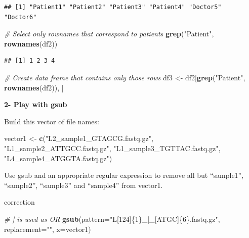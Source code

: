 \documentclass[]{book}
\newenvironment{Shaded}{\begin{snugshade}}{\end{snugshade}}
\newcommand{\CommentTok}[1]{\textcolor[rgb]{0.56,0.35,0.01}{\textit{#1}}}
\newcommand{\DataTypeTok}[1]{\textcolor[rgb]{0.13,0.29,0.53}{#1}}
\newcommand{\KeywordTok}[1]{\textcolor[rgb]{0.13,0.29,0.53}{\textbf{#1}}}
\newcommand{\NormalTok}[1]{#1}
\newcommand{\StringTok}[1]{\textcolor[rgb]{0.31,0.60,0.02}{#1}}
\begin{document}
\begin{verbatim}
## [1] "Patient1" "Patient2" "Patient3" "Patient4" "Doctor5"  "Doctor6"
\end{verbatim}

\begin{Shaded}
\begin{Highlighting}[]
\CommentTok{# Select only rownames that correspond to patients}
\KeywordTok{grep}\NormalTok{(}\StringTok{"Patient"}\NormalTok{, }\KeywordTok{rownames}\NormalTok{(df2))}
\end{Highlighting}
\end{Shaded}

\begin{verbatim}
## [1] 1 2 3 4
\end{verbatim}

\begin{Shaded}
\begin{Highlighting}[]
\CommentTok{# Create data frame that contains only those rows}
\NormalTok{df3 <-}\StringTok{ }\NormalTok{df2[}\KeywordTok{grep}\NormalTok{(}\StringTok{"Patient"}\NormalTok{, }\KeywordTok{rownames}\NormalTok{(df2)), ]}
\end{Highlighting}
\end{Shaded}

\textbf{2- Play with gsub}

Build this vector of file names:

\begin{Shaded}
\begin{Highlighting}[]
\NormalTok{vector1 <-}\StringTok{ }\KeywordTok{c}\NormalTok{(}\StringTok{"L2_sample1_GTAGCG.fastq.gz"}\NormalTok{, }\StringTok{"L1_sample2_ATTGCC.fastq.gz"}\NormalTok{, }
    \StringTok{"L1_sample3_TGTTAC.fastq.gz"}\NormalTok{, }\StringTok{"L4_sample4_ATGGTA.fastq.gz"}\NormalTok{)}
\end{Highlighting}
\end{Shaded}

Use gsub and an appropriate regular expression to remove all but ``sample1'', ``sample2'', ``sample3'' and ``sample4'' from vector1.

correction

\begin{Shaded}
\begin{Highlighting}[]
\CommentTok{# | is used as OR}
\KeywordTok{gsub}\NormalTok{(}\DataTypeTok{pattern=}\StringTok{"L[124]\{1\}_|_[ATGC]\{6\}.fastq.gz"}\NormalTok{, }
    \DataTypeTok{replacement=}\StringTok{""}\NormalTok{, }
    \DataTypeTok{x=}\NormalTok{vector1)}
\end{Highlighting}
\end{Shaded}
\end{document}

